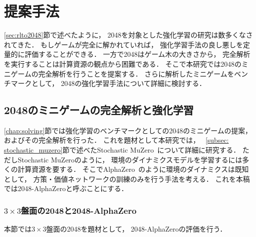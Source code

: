 \chapter{提案手法}
\label{chap:proposal}
\ref{sec:rlto2048}節で述べたように， 2048を対象とした強化学習の研究は数多くなされてきた．
もしゲームが完全に解かれていれば， 強化学習手法の良し悪しを定量的に評価することができる．
一方で2048はゲーム木の大きさから， 完全解析を実行することは計算資源の観点から困難である．
そこで本研究では2048のミニゲームの完全解析を行うことを提案する．
さらに解析したミニゲームをベンチマークとして， 2048の強化学習手法について詳細に検討する．



\section{2048のミニゲームの完全解析と強化学習}
\ref{chap:solving}節では強化学習のベンチマークとしての2048のミニゲームの提案， およびその完全解析を行った．
これを題材として本研究では， ~\ref{subsec: stochastic_muzero}節で述べたStochastic MuZero~\cite{StochasticMuZero}について詳細に研究する．
ただしStochastic MuZeroのように， 環境のダイナミクスモデルを学習するには多くの計算資源を要する．
そこでAlphaZero~\cite{AlphaZero}のように環境のダイナミクスは既知として， 方策・価値ネットワークの訓練のみを行う手法を考える．
これを本稿では2048-AlphaZeroと呼ぶことにする．

\subsection{$3\times3$盤面の2048と2048-AlphaZero}
本節では$3\times3$盤面の2048を題材として， 2048-AlphaZeroの評価を行う．

